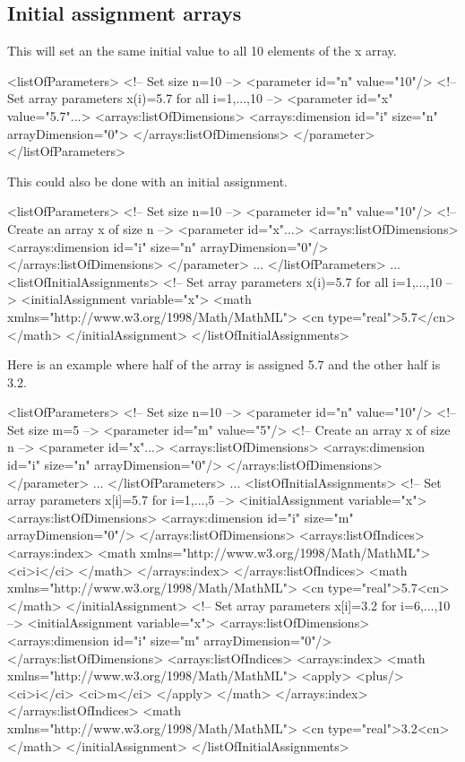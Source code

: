 \subsection{Initial assignment arrays}

This will set an the same initial value to all 10 elements of the x array.

\begin{example}
<listOfParameters>
 <!-- Set size n=10 -->
 <parameter id="n" value="10"/>
 <!-- Set array parameters x(i)=5.7 for all i=1,...,10 -->
 <parameter id="x" value="5.7"...>
  <arrays:listOfDimensions>
   <arrays:dimension id="i" size="n" arrayDimension="0">
  </arrays:listOfDimensions> 
 </parameter>
</listOfParameters>
\end{example}

This could also be done with an initial assignment.

\begin{example}
<listOfParameters> 
  <!-- Set size n=10 -->
  <parameter id="n" value="10"/>
  <!-- Create an array x of size n -->
  <parameter id="x"...>
    <arrays:listOfDimensions>
      <arrays:dimension id="i" size="n" arrayDimension="0"/> 
    </arrays:listOfDimensions>
  </parameter> ...
</listOfParameters> ...
<listOfInitialAssignments>
  <!-- Set array parameters x(i)=5.7 for all i=1,...,10 -->
  <initialAssignment variable="x">
    <math xmlns="http://www.w3.org/1998/Math/MathML">
      <cn type="real">5.7</cn>
    </math>
  </initialAssignment>
</listOfInitialAssignments>
\end{example}

Here is an example where half of the array is assigned 5.7 and the other half is 3.2. 

\begin{example}
<listOfParameters> 
 <!-- Set size n=10 -->
 <parameter id="n" value="10"/>
 <!-- Set size m=5 -->
 <parameter id="m" value="5"/>
 <!-- Create an array x of size n -->
 <parameter id="x"...>
  <arrays:listOfDimensions>
   <arrays:dimension id="i" size="n" arrayDimension="0"/> 
  </arrays:listOfDimensions>
 </parameter> ...
</listOfParameters> ...
<listOfInitialAssignments>
 <!-- Set array parameters x[i]=5.7 for i=1,...,5 -->
 <initialAssignment variable="x"> 
  <arrays:listOfDimensions>
   <arrays:dimension id="i" size="m" arrayDimension="0"/>
  </arrays:listOfDimensions>
  <arrays:listOfIndices>
   <arrays:index>
    <math xmlns="http://www.w3.org/1998/Math/MathML">
      <ci>i</ci>
    </math>
   </arrays:index>
  </arrays:listOfIndices>
  <math xmlns="http://www.w3.org/1998/Math/MathML">
    <cn type="real">5.7<cn>
  </math>
 </initialAssignment>
 <!-- Set array parameters x[i]=3.2 for i=6,...,10 -->
 <initialAssignment variable="x">
  <arrays:listOfDimensions>
   <arrays:dimension id="i" size="m" arrayDimension="0"/>
  </arrays:listOfDimensions>
  <arrays:listOfIndices>
   <arrays:index>
    <math xmlns="http://www.w3.org/1998/Math/MathML">
     <apply>
       <plus/>
        <ci>i</ci>
        <ci>m</ci>
     </apply>
    </math>
   </arrays:index>
  </arrays:listOfIndices>
  <math xmlns="http://www.w3.org/1998/Math/MathML">
    <cn type="real">3.2<cn>
  </math>
 </initialAssignment>
</listOfInitialAssignments>
\end{example}

